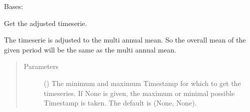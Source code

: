 \documentclass[letterpaper,10pt,english]{sphinxmanual}
\begin{document}
\begin{fulllineitems}
\label{\detokenize{weatherDB:weatherDB.station.TemperatureStation}}
\sphinxAtStartPar
Bases: {\hyperref[\detokenize{weatherDB:weatherDB.station.StationTETBase}]{}}

\begin{fulllineitems}
\label{\detokenize{weatherDB:weatherDB.station.TemperatureStation.__init__}}
\end{fulllineitems}


\begin{fulllineitems}
\label{\detokenize{weatherDB:weatherDB.station.TemperatureStation.get_adj}}
\sphinxAtStartPar
Get the adjusted timeserie.

\sphinxAtStartPar
The timeserie is adjusted to the multi annual mean.
So the overall mean of the given period will be the same as the multi annual mean.
\begin{quote}\begin{description}
\item[{Parameters}] \leavevmode
\sphinxAtStartPar
{} (\sphinxstyleliteralemphasis{\sphinxupquote{, }}) \textendash{} The minimum and maximum Timestamp for which to get the timeseries.
If None is given, the maximum or minimal possible Timestamp is taken.
The default is (None, None).


\end{description}
\end{quote}
\end{fulllineitems}
\end{fulllineitems}
\end{document}
